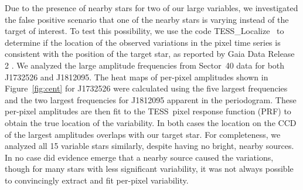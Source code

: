 \documentclass[twocolumn, linenumbers]{aastex631}
\newcommand{\tess}{TESS}
\newcommand{\tesslocalize}{{{\fontfamily{lmtt}\selectfont TESS\_Localize}}}
\begin{document}

Due to the presence of nearby stars for two of our large variables, we investigated the false positive scenario that one of the nearby stars is varying instead of the target of interest. To test this possibility, we use the code \tesslocalize\ \citep{HiggensBell} to determine if the location of the observed variations in the pixel time series is consistent with the position of the target star, as reported by Gaia Data Release 2 \citep{gaiaDR22018}.  We analyzed the large amplitude frequencies from Sector~40 data for both J1732526 and J1812095. The heat maps of per-pixel amplitudes shown in Figure~\ref{fig:cent} for J1732526 were calculated using the five largest frequencies and the two largest frequencies for J1812095 apparent in the periodogram.  These per-pixel amplitudes are then fit to the \tess\ pixel response function (PRF) to obtain the true location of the variability. In both cases the location on the CCD of the largest amplitudes overlaps with our target star.  For completeness, we analyzed all 15 variable stars similarly, despite having no bright, nearby sources. In no case did evidence emerge that a nearby source caused the variations, though for many stars with less significant variability, it was not always possible to convincingly extract and fit per-pixel variability.



\vspace{-1em}
\end{document}
